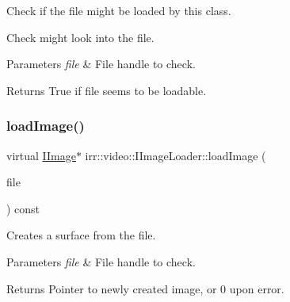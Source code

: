 Check if the file might be loaded by this class. 

Check might look into the file. 
\begin{DoxyParams}{Parameters}
{\em file} & File handle to check. \\
\hline
\end{DoxyParams}
\begin{DoxyReturn}{Returns}
True if file seems to be loadable. 
\end{DoxyReturn}
\mbox{\label{classirr_1_1video_1_1IImageLoader_ac3cafd8396e2f6e762f91604bcacf5d3}} 
\subsubsection{\texorpdfstring{load\+Image()}{loadImage()}\hspace{0.1cm}{\footnotesize\ttfamily [1/2]}}
{\footnotesize\ttfamily virtual \hyperlink{classirr_1_1video_1_1IImage}{I\+Image}$\ast$ irr\+::video\+::\+I\+Image\+Loader\+::load\+Image (\begin{DoxyParamCaption}\item[{\hyperlink{classirr_1_1io_1_1IReadFile}{io\+::\+I\+Read\+File} $\ast$}]{file }\end{DoxyParamCaption}) const\hspace{0.3cm}{\ttfamily [pure virtual]}}



Creates a surface from the file. 


\begin{DoxyParams}{Parameters}
{\em file} & File handle to check. \\
\hline
\end{DoxyParams}
\begin{DoxyReturn}{Returns}
Pointer to newly created image, or 0 upon error. 
\end{DoxyReturn}
\mbox{\label{classirr_1_1video_1_1IImageLoader_ac3cafd8396e2f6e762f91604bcacf5d3}} 
